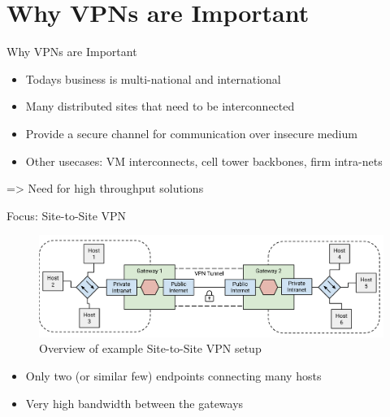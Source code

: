 \documentclass[NET,english]{tumbeamer}
\begin{document}

%

%

\section{Why VPNs are Important}
\begin{frame}{Why VPNs are Important}
	\begin{itemize}
		\item Todays business is multi-national and international
		\item Many distributed sites that need to be interconnected
		\item Provide a secure channel for communication over insecure medium
		\item Other usecases: VM interconnects, cell tower backbones, firm intra-nets
	\end{itemize}
	
	=> Need for high throughput solutions
	
\end{frame}

\begin{frame}{Focus: Site-to-Site VPN}
	\begin{figure}
		\centering
		\includegraphics[width=1\linewidth]{figures/Site_to_Site_VPN}
		\caption{Overview of example Site-to-Site VPN setup}
		\label{fig:sitetositevpn}
	\end{figure}
	
	\begin{itemize}
		\item Only two (or similar few) endpoints connecting many hosts
		\item Very high bandwidth between the gateways
	\end{itemize}
\end{frame}
\end{document}
